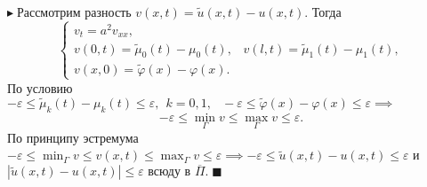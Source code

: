 
$\blacktriangleright\;$Рассмотрим разность $v(x, t) = \widetilde{u}(x, t) - u(x, t).$ Тогда
$$
\begin{cases}
    v_t = a^2 v_{xx}, \\
    v(0, t) = \widetilde{\mu}_0(t) - \mu_0(t),\;\;\; v(l, t) = \widetilde{\mu}_1(t) - \mu_1(t),\\
    v(x, 0) = \widetilde{\varphi}(x) - \varphi(x).
\end{cases}
$$
По условию $\displaystyle -\varepsilon \leq \widetilde{\mu}_k(t) - \mu_k(t) \leq \varepsilon, \;\, k = 0, 1,\;\;\, -\varepsilon \leq \widetilde{\varphi}(x) - \varphi(x) \leq \varepsilon \implies$ $$-\varepsilon \leq \min_\Gamma v \leq \max_\Gamma v \leq \varepsilon.$$\noindent
По принципу эстремума $\displaystyle -\varepsilon \leq \min_\Gamma v \leq v(x, t) \leq \max_\Gamma v \leq \varepsilon \implies -\varepsilon \leq \widetilde{u}(x, t) - u(x, t) \leq \varepsilon$ и $|\widetilde{u}(x, t) - u(x, t)| \leq \varepsilon \text{ всюду в } \overline{\Pi}.$$\;\blacksquare$


